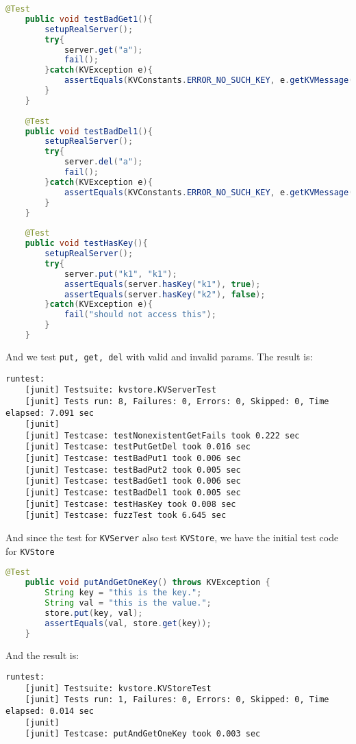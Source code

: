 \documentclass{article}
\begin{document}
\begin{lstlisting}[language=java]
    @Test
    public void testBadGet1(){
    	setupRealServer();
    	try{
    		server.get("a");
    		fail();
    	}catch(KVException e){
    		assertEquals(KVConstants.ERROR_NO_SUCH_KEY, e.getKVMessage().getMessage());
    	}
    }
    
    @Test
    public void testBadDel1(){
    	setupRealServer();
    	try{
    		server.del("a");
    		fail();
    	}catch(KVException e){
    		assertEquals(KVConstants.ERROR_NO_SUCH_KEY, e.getKVMessage().getMessage());
    	}
    }
    
    @Test
    public void testHasKey(){
    	setupRealServer();
    	try{
    		server.put("k1", "k1");
    		assertEquals(server.hasKey("k1"), true);
    		assertEquals(server.hasKey("k2"), false);
    	}catch(KVException e){
    		fail("should not access this");
    	}
    }
\end{lstlisting}

And we test \texttt{put, get, del} with valid and invalid params. The result is:
\begin{lstlisting}
runtest:
    [junit] Testsuite: kvstore.KVServerTest
    [junit] Tests run: 8, Failures: 0, Errors: 0, Skipped: 0, Time elapsed: 7.091 sec
    [junit] 
    [junit] Testcase: testNonexistentGetFails took 0.222 sec
    [junit] Testcase: testPutGetDel took 0.016 sec
    [junit] Testcase: testBadPut1 took 0.006 sec
    [junit] Testcase: testBadPut2 took 0.005 sec
    [junit] Testcase: testBadGet1 took 0.006 sec
    [junit] Testcase: testBadDel1 took 0.005 sec
    [junit] Testcase: testHasKey took 0.008 sec
    [junit] Testcase: fuzzTest took 6.645 sec
\end{lstlisting}

And since the test for \texttt{KVServer} also test \texttt{KVStore}, we have the initial test code for \texttt{KVStore}

\begin{lstlisting}[language=java]
    @Test
    public void putAndGetOneKey() throws KVException {
        String key = "this is the key.";
        String val = "this is the value.";
        store.put(key, val);
        assertEquals(val, store.get(key));
    }
\end{lstlisting}

And the result is:
\begin{lstlisting}
runtest:
    [junit] Testsuite: kvstore.KVStoreTest
    [junit] Tests run: 1, Failures: 0, Errors: 0, Skipped: 0, Time elapsed: 0.014 sec
    [junit] 
    [junit] Testcase: putAndGetOneKey took 0.003 sec
\end{lstlisting}
\end{document}
